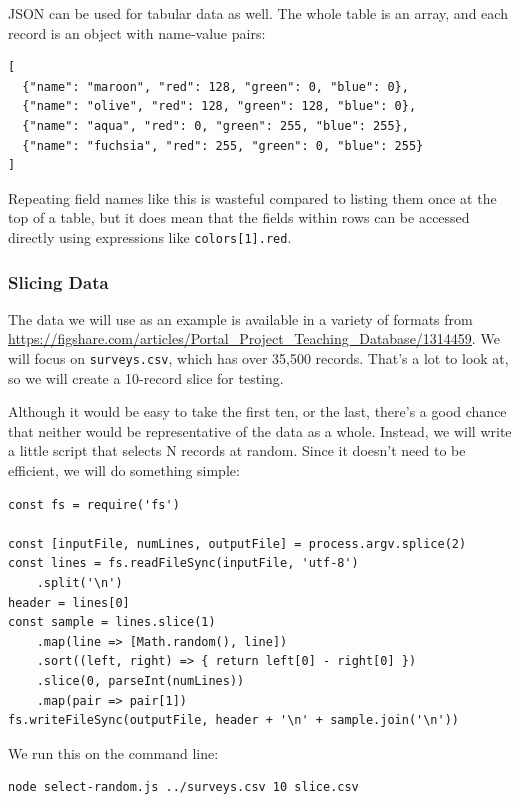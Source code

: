 JSON can be used for tabular data as well. The whole table is an array,
and each record is an object with name-value pairs:

\begin{verbatim}
[
  {"name": "maroon", "red": 128, "green": 0, "blue": 0},
  {"name": "olive", "red": 128, "green": 128, "blue": 0},
  {"name": "aqua", "red": 0, "green": 255, "blue": 255},
  {"name": "fuchsia", "red": 255, "green": 0, "blue": 255}
]
\end{verbatim}

Repeating field names like this is wasteful compared to listing them
once at the top of a table, but it does mean that the fields within rows
can be accessed directly using expressions like
\texttt{colors{[}1{]}.red}.

\subsubsection{Slicing Data}\label{s:data-slicing}

The data we will use as an example is available in a variety of formats
from
\url{https://figshare.com/articles/Portal_Project_Teaching_Database/1314459}.
We will focus on \texttt{surveys.csv}, which has over 35,500 records.
That's a lot to look at, so we will create a 10-record slice for
testing.

Although it would be easy to take the first ten, or the last, there's a
good chance that neither would be representative of the data as a whole.
Instead, we will write a little script that selects N records at random.
Since it doesn't need to be efficient, we will do something simple:

\begin{verbatim}
const fs = require('fs')

const [inputFile, numLines, outputFile] = process.argv.splice(2)
const lines = fs.readFileSync(inputFile, 'utf-8')
    .split('\n')
header = lines[0]
const sample = lines.slice(1)
    .map(line => [Math.random(), line])
    .sort((left, right) => { return left[0] - right[0] })
    .slice(0, parseInt(numLines))
    .map(pair => pair[1])
fs.writeFileSync(outputFile, header + '\n' + sample.join('\n'))
\end{verbatim}

We run this on the command line:

\begin{verbatim}
node select-random.js ../surveys.csv 10 slice.csv
\end{verbatim}

